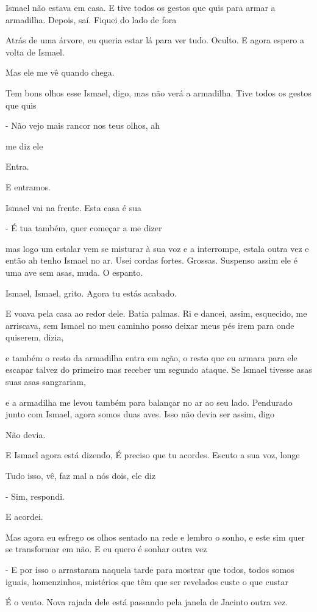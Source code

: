 Ismael não estava em casa. E tive todos os gestos que quis para armar a
armadilha. Depois, saí. Fiquei do lado de fora

Atrás de uma árvore, eu queria estar lá para ver tudo. Oculto. E agora
espero a volta de Ismael.

Mas ele me vê quando chega.

Tem bons olhos esse Ismael, digo, mas não verá a armadilha. Tive todos
os gestos que quis

- Não vejo mais rancor nos teus olhos, ah

me diz ele

Entra.

E entramos.

Ismael vai na frente. Esta casa é sua

- É tua também, quer começar a me dizer

mas logo um estalar vem se misturar à sua voz e a interrompe, estala
outra vez e então ah tenho Ismael no ar. Usei cordas fortes. Grossas.
Suspenso assim ele é uma ave sem asas, muda. O espanto.

Ismael, Ismael, grito. Agora tu estás acabado.

E voava pela casa ao redor dele. Batia palmas. Ri e dancei, assim,
esquecido, me arriscava, sem Ismael no meu caminho posso deixar meus pés
irem para onde quiserem, dizia,

e também o resto da armadilha entra em ação, o resto que eu armara para
ele escapar talvez do primeiro mas receber um segundo ataque. Se Ismael
tivesse asas suas asas sangrariam,

e a armadilha me levou também para balançar no ar ao seu lado. Pendurado
junto com Ismael, agora somos duas aves. Isso não devia ser assim, digo

Não devia.

E Ismael agora está dizendo, É preciso que tu acordes. Escuto a sua voz,
longe

Tudo isso, vê, faz mal a nós dois, ele diz

- Sim, respondi.

E acordei.

Mas agora eu esfrego os olhos sentado na rede e lembro o sonho, e este
sim quer se transformar em não. E eu quero é sonhar outra vez

- E por isso o arrastaram naquela tarde para mostrar que todos, todos
somos iguais, homenzinhos, mistérios que têm que ser revelados custe o
que custar

É o vento. Nova rajada dele está passando pela janela de Jacinto outra
vez.

